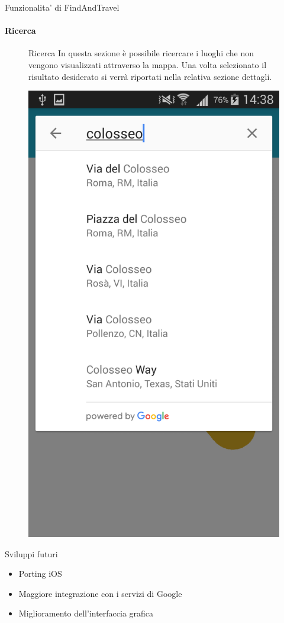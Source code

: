 \documentclass[10pt,a4paper]{beamer}
\begin{document}
\begin{frame}{Funzionalita' di FindAndTravel}
\framesubtitle{Ricerca}
\begin{figure}
\begin{minipage}{0.45\textwidth}
 \begin{block}{Ricerca}
 In questa sezione è possibile ricercare i luoghi che non vengono visualizzati attraverso la mappa. Una volta selezionato il risultato desiderato si verrà riportati nella relativa sezione dettagli.
 \end{block}
\end{minipage}
\hfill
\begin{minipage}{0.35\textwidth}
  \includegraphics[scale=0.1]{ricerca.png}
\end{minipage}
\end{figure}
\end{frame}

\begin{frame}{Sviluppi futuri}
\begin{itemize}
\item Porting iOS
\item Maggiore integrazione con i servizi di Google
\item Miglioramento dell'interfaccia grafica
\end{itemize}
\end{frame}
\end{document}
